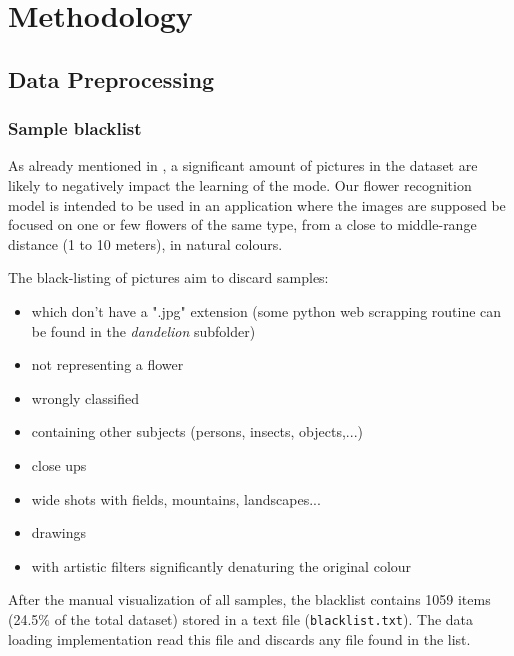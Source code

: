 \section{Methodology}

\subsection{Data Preprocessing}
\label{subsec:Data_Preprocessing}

\subsubsection{Sample blacklist}

As already mentioned in , a significant amount of pictures in the dataset are likely to negatively impact the learning of the mode. Our flower recognition model is intended to be used in an application where the images are supposed be focused on one or few flowers of the same type, from a close to middle-range distance (1 to 10 meters), in natural colours.

The black-listing of pictures aim to discard samples:
\begin{itemize}
	\setlength\itemsep{1pt}
	\setlength{\parskip}{0pt}
	\setlength{\parsep}{0pt}
	\item which don't have a ".jpg" extension (some python web scrapping routine can be found in the \textit{dandelion} subfolder)
	\item not representing a flower
	\item wrongly classified
	\item containing other subjects (persons, insects, objects,...)
	\item close ups
	\item wide shots with fields, mountains, landscapes...
	\item drawings
	\item with artistic filters significantly denaturing the original colour
\end{itemize}

After the manual visualization of all samples, the blacklist contains 1059 items (24.5\% of the total dataset) stored in a text file (\texttt{blacklist.txt}). The data loading implementation read this file and discards any file found in the list. 

